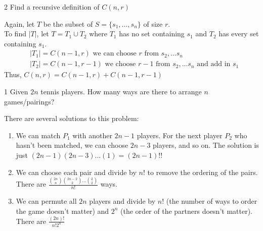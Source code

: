 \begin{exercise}
    2 Find a recursive definition of $C(n, r)$
\end{exercise}

\begin{solution}
    Again, let $T$ be the subset of $S = \{s_1, ... , s_n\}$ of size $r$.\\
    To find $|T|$, let $T = T_1 \cup T_2$ where $T_1$ has no set containing $s_1$ and $T_2$ has every set containing $s_1$.
    \begin{align*}
        &|T_1| = C(n-1, r) \text{ we can choose $r$ from $s_2, ... s_n$}\\
        &|T_2| = C(n-1, r-1) \text{ we choose $r-1$ from $s_2, ... s_n$ and add in $s_1$}
    \end{align*}
    Thus, $\boxed{C(n, r) = C(n-1, r) + C(n-1, r-1)}$
\end{solution}

\begin{problem}
    1 Given $2n$ tennis players. How many ways are there to arrange $n$ games/pairings?
\end{problem}

\begin{solution}
    There are several solutions to this problem:
    \begin{enumerate}
        \item We can match $P_1$ with another $2n - 1$ players. For the next player $P_2$ who hasn't been matched, we can choose $2n - 3$ players, and so on. The solution is just $(2n-1)(2n-3)...(1) = \boxed{(2n-1)!!}$
        \item We can choose each pair and divide by $n!$ to remove the ordering of the pairs. There are $\boxed{\frac{\binom{2n}{n}\binom{2n-2}{2} ... \binom{2}{2}}{n!}}$ ways. 
        \item We can permute all $2n$ players and divide by $n!$ (the number of ways to order the game doesn't matter) and $2^n$ (the order of the partners doesn't matter). There are $\boxed{\frac{(2n)!}{n!2^n}}$
    \end{enumerate}

\end{solution}
% 
